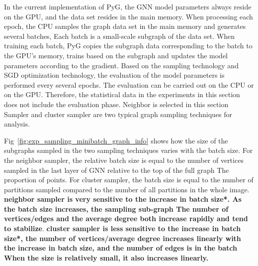 In the current implementation of PyG, the GNN model parameters always reside on the GPU,
and the data set resides in the main memory. When processing each epoch, the CPU samples
the graph data set in the main memory and generates several batches,
Each batch is a small-scale subgraph of the data set. When training each batch, 
PyG copies the subgraph data corresponding to the batch to the GPU's memory,
trains based on the subgraph and updates the model parameters according to the gradient.
Based on the sampling technology and SGD optimization technology, 
the evaluation of the model parameters is performed every several epochs. 
The evaluation can be carried out on the CPU or on the GPU. 
Therefore, the statistical data in the experiments in this section does not include the evaluation phase. 
Neighbor is selected in this section Sampler and cluster sampler are two typical graph sampling techniques for analysis.

Fig~\ref{fig:exp_sampling_minibatch_graph_info} shows how the size of the subgraphs sampled in the two sampling techniques varies with the batch size.
For the neighbor sampler, the relative batch size is equal to the number of vertices sampled in the last layer of GNN relative to the top of the full graph The proportion of points.
For cluster sampler, the batch size is equal to the number of partitions sampled compared to the number of all partitions in the whole image.
\textbf{neighbor sampler is very sensitive to the increase in batch size*. As the batch size increases, 
the sampling sub-graph The number of vertices/edges and the average degree both increase rapidly and tend to stabilize}.
\textbf{cluster sampler is less sensitive to the increase in batch size*, the number of vertices/average degree increases
linearly with the increase in batch size, and the number of edges is in the batch When the size is relatively small,
it also increases linearly.}

